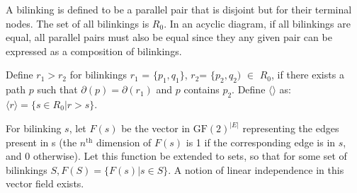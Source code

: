 \documentclass[sigplan,review,anonymous]{acmart}
\begin{document}
A bilinking is defined to be a parallel pair that is disjoint but for their terminal nodes. The set of all bilinkings is $R_0$.
In an acyclic diagram, if all bilinkings are equal, all parallel pairs must also be equal since they any given pair can be expressed as a composition of bilinkings.

Define $r_1>r_2$ for bilinkings $r_1$ = $\{p_1,q_1\}$, $r_2$= $\{p_2, q_2)$ $\in$ $R_0$, if there exists a path $p$ such that $\partial(p) = \partial(r_1)$ and $p$ contains $p_2$.
Define $\langle\rangle$ as:
$\langle r \rangle = \{ s\in R_0| r>s\}$.

For bilinking $s$, let $F(s)$ be the vector in $\text{GF}(2)^{|E|}$ representing the edges present in s (the $n^{\text{th}}$ dimension of $F(s)$ is 1 if the corresponding edge is in $s$, and 0 otherwise).
Let this function be extended to sets, so that for some set of bilinkings $S, F(S) = \{ F(s) | s\in S \}$. A notion of linear independence in this vector field exists.
\end{document}
